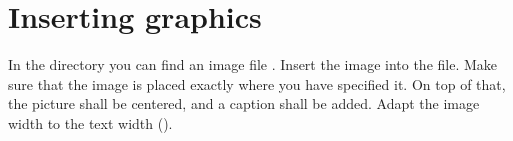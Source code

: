 \section{Inserting graphics}

In the  directory you can find an image file 
. Insert the image into the 
 file. Make sure that the image is placed 
exactly where you have specified it. On top of that, the picture shall be 
centered, and a caption shall be added. Adapt the image width to the text width 
().
